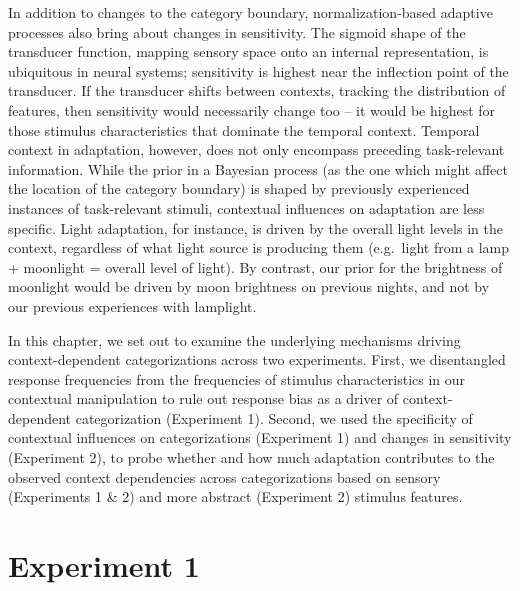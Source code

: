 \documentclass[a4paper, nobind]{templates/ociamthesis}
\begin{document}
In addition to changes to the category boundary, normalization-based adaptive processes also bring about changes in sensitivity. The sigmoid shape of the transducer function, mapping sensory space onto an internal representation, is ubiquitous in neural systems; sensitivity is highest near the inflection point of the transducer. If the transducer shifts between contexts, tracking the distribution of features, then sensitivity would necessarily change too -- it would be highest for those stimulus characteristics that dominate the temporal context. Temporal context in adaptation, however, does not only encompass preceding task-relevant information. While the prior in a Bayesian process (as the one which might affect the location of the category boundary) is shaped by previously experienced instances of task-relevant stimuli, contextual influences on adaptation are less specific. Light adaptation, for instance, is driven by the overall light levels in the context, regardless of what light source is producing them (e.g.~light from a lamp + moonlight = overall level of light). By contrast, our prior for the brightness of moonlight would be driven by moon brightness on previous nights, and not by our previous experiences with lamplight.

In this chapter, we set out to examine the underlying mechanisms driving context-dependent categorizations across two experiments. First, we disentangled response frequencies from the frequencies of stimulus characteristics in our contextual manipulation to rule out response bias as a driver of context-dependent categorization (Experiment 1). Second, we used the specificity of contextual influences on categorizations (Experiment 1) and changes in sensitivity (Experiment 2), to probe whether and how much adaptation contributes to the observed context dependencies across categorizations based on sensory (Experiments 1 \& 2) and more abstract (Experiment 2) stimulus features.

\hypertarget{experiment-1-1}{%
\section{Experiment 1}\label{experiment-1-1}}
\end{document}
